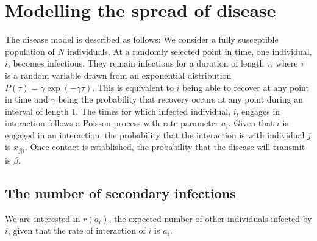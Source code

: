 \documentclass[twocolumn,8pt]{article}
\begin{document}
\section{Modelling the spread of disease}
The disease model is described as follows: We consider a fully susceptible population of $N$ individuals. At a randomly selected point in time, one individual, $i$, becomes infectious. They remain infectious for a duration of length $\tau$, where $\tau$ is a random variable drawn from an exponential distribution $P(\tau)=\gamma \exp(-\gamma \tau)$. This is equivalent to $i$ being able to recover at any point in time and $\gamma$ being the probability that recovery occurs at any point during an interval of length $1$. The times for which infected individual, $i$, engages in interaction follows a Poisson process with rate parameter $a_{i}$. Given that $i$ is engaged in an interaction, the probability that the interaction is with individual $j$ is $x_{j|i}$. Once contact is established, the probability that the disease will transmit is $\beta$.

\subsection{The number of secondary infections}
\label{disease_derivation}
We are interested in $r(a_{i})$, the expected number of other individuals infected by $i$, given that the rate of interaction of $i$ is $a_{i}$. 
\end{document}
